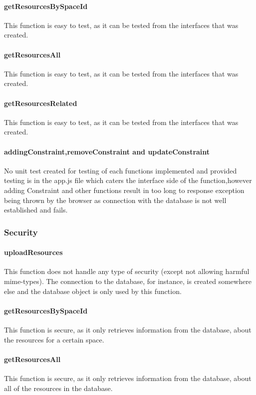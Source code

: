 \documentclass[a4paper]{article}
\begin{document}
\paragraph{getResourcesBySpaceId}
This function is easy to test, as it can be tested from the interfaces that was created.

\paragraph{getResourcesAll}
This function is easy to test, as it can be tested from the interfaces that was created.

\paragraph{getResourcesRelated}
This function is easy to test, as it can be tested from the interfaces that was created.

\paragraph{addingConstraint,removeConstraint and updateConstraint}
No unit test created for testing of each functions implemented and provided testing is in the app.js file which caters the interface side of the function,however adding Constraint and other functions result in too long to response exception being thrown by the browser as connection with the database is not well established and fails.

\subsubsection {Security}

\paragraph{uploadResources}
This function does not handle any type of security (except not allowing harmful mime-types). The connection to the database, for instance, is created somewhere else and the database object is only used by this function.

\paragraph{getResourcesBySpaceId}
This function is secure, as it only retrieves information from the database, about the resources for a certain space.

\paragraph{getResourcesAll}
This function is secure, as it only retrieves information from the database, about all of the resources in the database.
\end{document}
